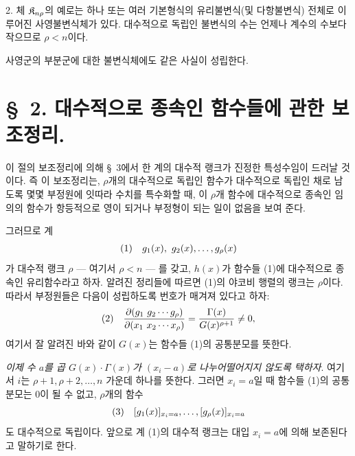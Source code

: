 2. 체 $\mathfrak K_{n\rho}$의 예로는 하나 또는 여러 기본형식의 유리불변식(및 다항불변식) 전체로 이루어진 사영불변식체가 있다. 대수적으로 독립인 불변식의 수는 언제나 계수의 수보다 작으므로 $\rho<n$이다.

사영군의 부분군에 대한 불변식체에도 같은 사실이 성립한다.

\section*{\S\ 2. 대수적으로 종속인 함수들에 관한 보조정리.}

이 절의 보조정리에 의해 \S\ 3에서 한 계의 대수적 랭크가 진정한 특성수임이 드러날 것이다. 즉 이 보조정리는, $\rho$개의 대수적으로 독립인 함수가 대수적으로 독립인 채로 남도록 몇몇 부정원에 잇따라 수치를 특수화할 때, 이 $\rho$개 함수에 대수적으로 종속인 임의의 함수가 항등적으로 영이 되거나 부정형이 되는 일이 없음을 보여 준다.

그러므로 계
\[
\begin{array}{@{}r@{\quad}l@{}}
(1)& g_1(x),\ g_2(x),\ldots,g_\rho(x)
\end{array}
\]
가 대수적 랭크 $\rho$ --- 여기서 $\rho<n$ --- 를 갖고, $h(x)$가 함수들 (1)에 대수적으로 종속인 유리함수라고 하자. 알려진 정리들에 따르면 (1)의 야코비 행렬의 랭크는 $\rho$이다. 따라서 부정원들은 다음이 성립하도록 번호가 매겨져 있다고 하자:
\[
\begin{array}{@{}r@{\quad}l@{}}
(2)& \displaystyle
\frac{\partial(g_1\ g_2\cdots g_\rho)}{\partial(x_1\ x_2\cdots x_\rho)}
=\frac{\Gamma(x)}{G(x)^{\rho+1}}\ne0,
\end{array}
\]
여기서 잘 알려진 바와 같이 $G(x)$는 함수들 (1)의 공통분모를 뜻한다.

\emph{이제 수 $a$를 곱 $G(x)\cdot\Gamma(x)$가 $(x_i-a)$로 나누어떨어지지 않도록 택하자}. 여기서 $i$는 $\rho+1,\rho+2,\ldots,n$ 가운데 하나를 뜻한다. 그러면 $x_i=a$일 때 함수들 (1)의 공통분모는 0이 될 수 없고, $\rho$개의 함수
\[
\begin{array}{@{}r@{\quad}l@{}}
(3)& [g_1(x)]_{x_i=a},\ldots,[g_\rho(x)]_{x_i=a}
\end{array}
\]
도 대수적으로 독립이다. 앞으로 계 (1)의 대수적 랭크는 대입 $x_i=a$에 의해 보존된다고 말하기로 한다.

